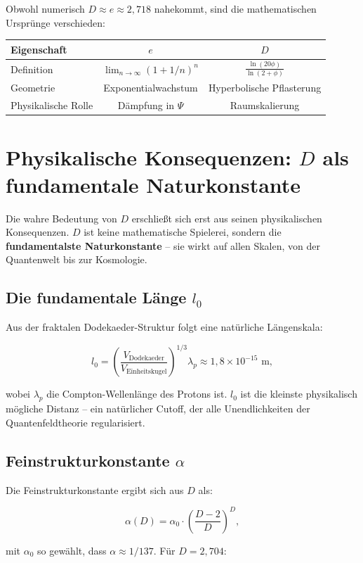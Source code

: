 \documentclass[11pt,a4paper]{article}
\begin{document}
Obwohl numerisch \(D \approx e \approx 2{,}718\) nahekommt, sind die mathematischen Ursprünge verschieden:

\begin{tabular}{l|c|c}
Eigenschaft & \(e\) & \(D\) \\ \hline
Definition & \(\lim_{n\to\infty} (1+1/n)^n\) & \(\frac{\ln(20\phi)}{\ln(2+\phi)}\) \\
Geometrie & Exponentialwachstum & Hyperbolische Pflasterung \\
Physikalische Rolle & Dämpfung in \(\Psi\) & Raumskalierung \\
\end{tabular}

\section{Physikalische Konsequenzen: \(D\) als fundamentale Naturkonstante}

Die wahre Bedeutung von \(D\) erschließt sich erst aus seinen physikalischen Konsequenzen. \(D\) ist keine mathematische Spielerei, sondern die \textbf{fundamentalste Naturkonstante} – sie wirkt auf allen Skalen, von der Quantenwelt bis zur Kosmologie.

\subsection{Die fundamentale Länge \(l_0\)}

Aus der fraktalen Dodekaeder-Struktur folgt eine natürliche Längenskala:

\[
l_0 = \left( \frac{V_{\text{Dodekaeder}}}{V_{\text{Einheitskugel}}} \right)^{1/3} \lambda_p \approx 1{,}8 \times 10^{-15} \text{ m},
\]

wobei \(\lambda_p\) die Compton-Wellenlänge des Protons ist. \(l_0\) ist die kleinste physikalisch mögliche Distanz – ein natürlicher Cutoff, der alle Unendlichkeiten der Quantenfeldtheorie regularisiert.

\subsection{Feinstrukturkonstante \(\alpha\)}

Die Feinstrukturkonstante ergibt sich aus \(D\) als:

\[
\alpha(D) = \alpha_0 \cdot \left( \frac{D-2}{D} \right)^D,
\]

mit \(\alpha_0\) so gewählt, dass \(\alpha \approx 1/137\). Für \(D = 2{,}704\):
\end{document}
